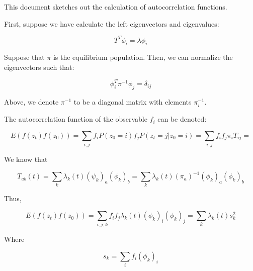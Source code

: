 \documentclass[12pt]{article}
\begin{document}
This document sketches out the calculation of autocorrelation functions.  


First, suppose we have calculate the left eigenvectors and eigenvalues:

$$T^T \phi_i = \lambda \phi_i$$

Suppose that $\pi$ is the equilibrium population.  Then, we can normalize the eigenvectors such that:

$$\phi_i^T \pi^{-1} \phi_j = \delta_{ij}$$

Above, we denote $\pi^{-1}$ to be a diagonal matrix with elements $\pi_i^{-1}$.

The autocorrelation function of the observable $f_i$ can be denoted:

$$E(f(z_t) f(z_0)) = \sum_{i,j} f_i P(z_0 = i) f_j P(z_t = j | z_0 = i) = \sum_{i,j} f_i  f_j \pi_i T_{ij} = $$

We know that

$$T_{ab}(t) = \sum_k \lambda_k(t) (\psi_k)_a (\phi_k)_b = \sum_k \lambda_k(t) (\pi_a)^{-1} (\phi_k)_a (\phi_k)_b$$

Thus,

$$E(f(z_t) f(z_0)) = \sum_{i,j,k} f_i f_j \lambda_k(t) (\phi_k)_i (\phi_k)_j = \sum_k \lambda_k(t) s_k^2$$

Where 

$$s_k = \sum_i f_i (\phi_k)_i$$
\end{document}
